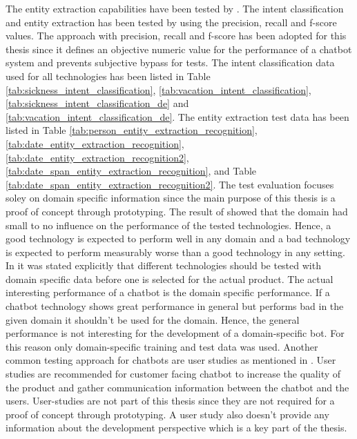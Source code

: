 The entity extraction capabilities have been tested by \citet{geyer2016named}.
The intent classification and entity extraction has been tested by \citet{braunEvaluatingNLU} 
using the precision, recall and f-score values.
The approach with precision, recall and f-score has been adopted for this thesis 
since it defines an objective numeric value for the performance of a chatbot system 
and prevents subjective bypass for tests.
The intent classification data used for all technologies has been listed in Table \ref{tab:sickness_intent_classification},
\ref{tab:vacation_intent_classification}, \ref{tab:sickness_intent_classification_de} and \ref{tab:vacation_intent_classification_de}.
The entity extraction test data has been listed in Table \ref{tab:person_entity_extraction_recognition}, 
\ref{tab:date_entity_extraction_recognition}, \ref{tab:date_entity_extraction_recognition2}, 
\ref{tab:date_span_entity_extraction_recognition}, and Table \ref{tab:date_span_entity_extraction_recognition2}.
The test evaluation focuses soley on domain specific information since the main purpose 
of this thesis is a proof of concept through prototyping.
The result of \citet{braunEvaluatingNLU} showed that the domain had small to no influence on the 
performance of the tested technologies.
Hence, a good technology is expected to perform well in any domain and a bad technology is expected
to perform measurably worse than a good technology in any setting.
In \citet{braunEvaluatingNLU} it was stated explicitly that different technologies should be tested 
with domain specific data before one is selected for the actual product.
The actual interesting performance of a chatbot is the domain specific performance.
If a chatbot technology shows great performance in general but performs bad in the 
given domain it shouldn't be used for the domain.
Hence, the general performance is not interesting for the development of a 
domain-specific bot.
For this reason only domain-specific training and test data was used.
Another common testing approach for chatbots are user studies as mentioned in \citet{evaluateChatbotsShawar2007}.
User studies are recommended for customer facing chatbot to increase the quality of the 
product and gather communication information between the chatbot and the users.
User-studies are not part of this thesis since they are not required for a proof of concept 
through prototyping.
A user study also doesn't provide any information about the development perspective which is 
a key part of the thesis.




